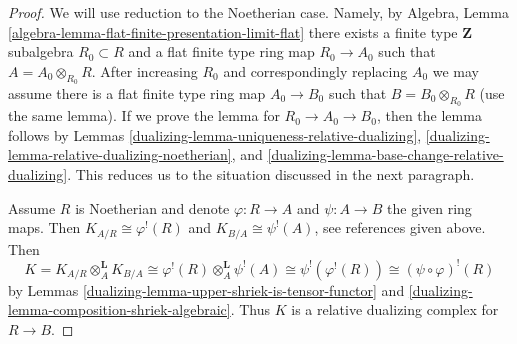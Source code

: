 \begin{proof}

We will use reduction to the Noetherian case.
Namely, by Algebra, Lemma
\ref{algebra-lemma-flat-finite-presentation-limit-flat}
there exists a finite type $\mathbf{Z}$ subalgebra $R_0 \subset R$
and a flat finite type ring map $R_0 \to A_0$ such that
$A = A_0 \otimes_{R_0} R$. After increasing $R_0$ and correspondingly
replacing $A_0$ we may assume there is a flat
finite type ring map $A_0 \to B_0$ such that $B = B_0 \otimes_{R_0} R$
(use the same lemma). If we prove the lemma for $R_0 \to A_0 \to B_0$,
then the lemma follows by Lemmas
\ref{dualizing-lemma-uniqueness-relative-dualizing},
\ref{dualizing-lemma-relative-dualizing-noetherian}, and
\ref{dualizing-lemma-base-change-relative-dualizing}.
This reduces us to the situation discussed in the next paragraph.

\medskip\noindent
Assume $R$ is Noetherian and denote $\varphi : R \to A$ and
$\psi : A \to B$ the given ring maps. Then $K_{A/R} \cong \varphi^!(R)$ and
$K_{B/A} \cong \psi^!(A)$, see references given above.
Then
$$
K = K_{A/R} \otimes_A^\mathbf{L} K_{B/A} \cong
\varphi^!(R) \otimes_A^\mathbf{L} \psi^!(A) \cong
\psi^!(\varphi^!(R)) \cong (\psi \circ \varphi)^!(R)
$$
by Lemmas \ref{dualizing-lemma-upper-shriek-is-tensor-functor} and
\ref{dualizing-lemma-composition-shriek-algebraic}. Thus $K$ is a relative
dualizing complex for $R \to B$.
\end{proof}



